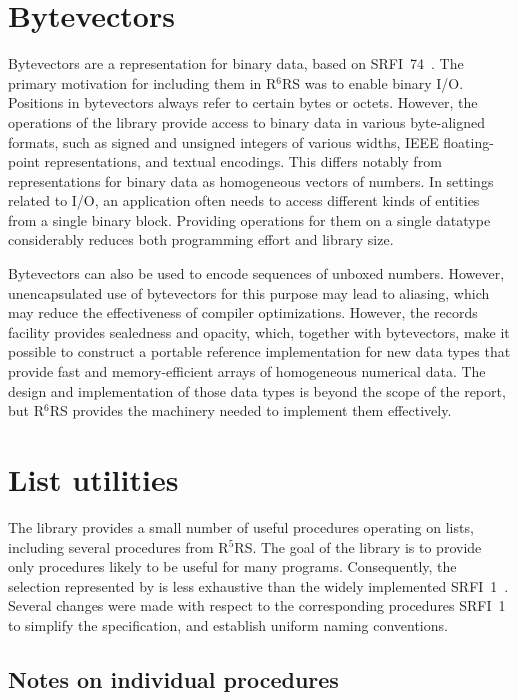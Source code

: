 \documentclass[twoside,twocolumn]{algol60}
\newcommand{\rn}[1]{R$^{#1}$RS}
\begin{document}
\chapter{Bytevectors}

Bytevectors are a representation for binary data, based on
SRFI~74~\cite{srfi74}.  The primary motivation for including them in
\rn{6} was to enable binary I/O.  Positions in bytevectors always
refer to certain bytes or octets.  However, the operations of the
 library provide access to binary data in
various byte-aligned formats, such as signed and unsigned integers of
various widths, IEEE floating-point representations, and textual
encodings.  This differs notably from representations for binary data
as homogeneous vectors of numbers.  In settings related to I/O, an
application often needs to access different kinds of entities from a
single binary block.  Providing operations for them on a single
datatype considerably reduces both programming effort and library
size.

Bytevectors can also be used to encode sequences of unboxed numbers.
However, unencapsulated use of bytevectors for this purpose may lead
to aliasing, which may reduce the effectiveness of compiler
optimizations.  However, the records facility provides sealedness and
opacity, which, together with bytevectors, make it possible to
construct a portable reference implementation for new data types that
provide fast and memory-efficient arrays of homogeneous numerical
data.  The design and implementation of those data types is beyond the
scope of the report, but \rn{6} provides the machinery needed to
implement them effectively.

\chapter{List utilities}

The  library provides a small number of useful
procedures operating on lists, including several procedures from
\rn{5}.  The goal of the library is to provide only procedures likely
to be useful for many programs.  Consequently, the selection
represented by  is less exhaustive than the widely
implemented SRFI~1~\cite{srfi1}.  Several changes were made with
respect to the corresponding procedures SRFI~1 to simplify the
specification, and establish uniform naming conventions.

\section{Notes on individual procedures}
\end{document}
